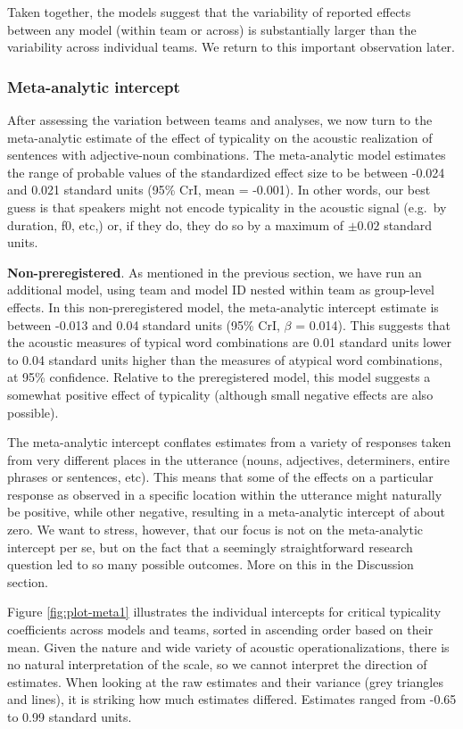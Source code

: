 \documentclass[Review,times,sageh]{sagej}
\begin{document}
Taken together, the models suggest that the variability of reported effects between any model (within team or across) is substantially larger than the variability across individual teams.
We return to this important observation later.

\hypertarget{meta-analytic-intercept}{%
\subsubsection{Meta-analytic intercept}\label{meta-analytic-intercept}}

After assessing the variation between teams and analyses, we now turn to the meta-analytic estimate of the effect of typicality on the acoustic realization of sentences with adjective-noun combinations.
The meta-analytic model estimates the range of probable values of the standardized effect size to be between -0.024 and 0.021 standard units (95\% CrI, mean = -0.001).
In other words, our best guess is that speakers might not encode typicality in the acoustic signal (e.g.~by duration, f0, etc,) or, if they do, they do so by a maximum of \(\pm 0.02\) standard units.

\textbf{Non-preregistered}. As mentioned in the previous section, we have run an additional model, using team and model ID nested within team as group-level effects.
In this non-preregistered model, the meta-analytic intercept estimate is between -0.013 and 0.04 standard units (95\% CrI, \(\beta\) = 0.014).
This suggests that the acoustic measures of typical word combinations are 0.01 standard units lower to 0.04 standard units higher than the measures of atypical word combinations, at 95\% confidence.
Relative to the preregistered model, this model suggests a somewhat positive effect of typicality (although small negative effects are also possible).

The meta-analytic intercept conflates estimates from a variety of responses taken from very different places in the utterance (nouns, adjectives, determiners, entire phrases or sentences, etc).
This means that some of the effects on a particular response as observed in a specific location within the utterance might naturally be positive, while other negative, resulting in a meta-analytic intercept of about zero.
We want to stress, however, that our focus is not on the meta-analytic intercept per se, but on the fact that a seemingly straightforward research question led to so many possible outcomes.
More on this in the Discussion section.

Figure \ref{fig:plot-meta1} illustrates the individual intercepts for critical typicality coefficients across models and teams, sorted in ascending order based on their mean.
Given the nature and wide variety of acoustic operationalizations, there is no natural interpretation of the scale, so we cannot interpret the direction of estimates.
When looking at the raw estimates and their variance (grey triangles and lines), it is striking how much estimates differed.
Estimates ranged from -0.65 to 0.99 standard units.
\end{document}
